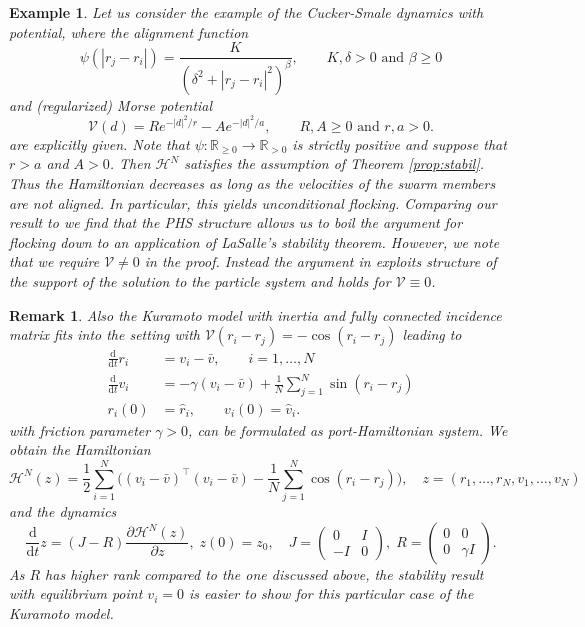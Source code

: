 \documentclass[11pt]{article}
\newtheorem{example}[theorem]{Example}
\newtheorem*{remark}{Remark}
\newcommand{\R}[0]{\mathbb R}
\newcommand{\calH}[0]{\mathcal H}
\newcommand{\calV}[0]{\mathcal V}
\newcommand{\dd}[0]{\mathrm d}
\newcommand{\sumj}[0]{\sum_{j=1}^N}
\newcommand{\sumi}[0]{\sum_{i=1}^N}
\newcommand{\V}[0]{\mathcal V}
\begin{document}
\begin{bibunit}[abbrv]
\begin{example}
Let us consider the example of the Cucker-Smale dynamics with potential, where the alignment function \cite{carrillo2010particle}  
\[
\psi(|r_j - r_i|) = \frac{K}{(\delta^2 + |r_j - r_i|^2)^\beta}, \qquad K,\delta >0 \text{ and }\beta \ge 0
\]
and (regularized) Morse potential \cite{Dorsogna2006self}
\[
\calV(d) = R e^{-|d|^2/r} - A e^{-|d|^2/a}, \qquad R,A \ge 0 \text{ and } r,a >0.
\]
are explicitly given. Note that $\psi \colon \R_{\ge 0} \rightarrow \R_{>0}$ is strictly positive and suppose that $r>a$ and $A>0$. 
 Then $\calH^N$ satisfies the assumption of  Theorem \ref{prop:stabil}. Thus  the Hamiltonian decreases as long as the velocities of the swarm members are not aligned. In particular, this yields unconditional flocking. Comparing our result to \cite{carrillo2010asymptotic} we find that the PHS structure allows us to boil the argument for flocking down to an application of LaSalle's stability theorem. However, we note that we require $\V\ne 0$ in the proof. Instead the argument in  \cite{carrillo2010asymptotic} exploits structure of the support of the solution to the particle system and holds for $\V \equiv 0$. 
 \end{example}

\begin{remark}
 Also the Kuramoto model with inertia and fully connected incidence matrix \cite{tanaka1997first}  fits into the setting with $\V(r_i - r_j) = -\cos(r_i -r_j)$ leading to
\begin{subequations} \label{eq:xvsimple}
\begin{align}
    \frac{\dd}{\dd t} r_i &= v_i-\bar v, \qquad i=1,\dots,N\\
    \frac{\dd}{\dd t} v_i &= -\gamma  (v_i-\bar v) + \frac{1}{N} \sumj \sin(r_i - r_j)\\ 
    r_i(0) &= \hat r_i, \qquad v_i(0) = \hat v_i.
\end{align}
\end{subequations}
with friction parameter $\gamma>0$, can be formulated as port-Hamiltonian system.  We obtain the  Hamiltonian 
\[
\calH^N(z) = \frac12\sumi \Big(  (v_i-\bar v)^\top (v_i - \bar v) - \frac1N \sumj \cos(r_i - r_j) \Big),\quad z=(r_1,\dots,r_N, v_1,\dots, v_N)
\]
and the dynamics
\[
\frac{\dd}{\dd t} z = (J-R) \frac{\partial \calH^N(z)}{\partial z}, \; z(0)=z_0, \quad J = \begin{pmatrix} 0 & I  \\ -I& 0 \end{pmatrix}, \; R = \begin{pmatrix} 0 & 0 \\ 0 & \gamma I \end{pmatrix}.
\]
As $R$ has higher rank compared to the one discussed above, the stability result with equilibrium point $v_i = 0$ is easier to show for this particular case of the Kuramoto model.
\end{remark}



\end{bibunit}
\end{document}
